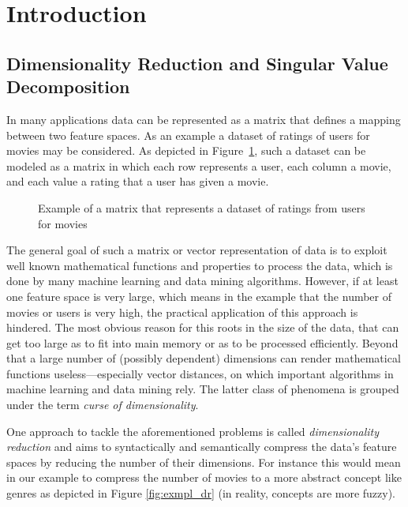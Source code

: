 \section{Introduction}

\subsection{Dimensionality Reduction and Singular Value Decomposition}

In many applications data can be represented as a matrix that defines a mapping
between two feature spaces. As an example a dataset of ratings of users for
movies may be considered. As depicted in Figure~\ref{fig:exmpl_matrix}, such a
dataset can be modeled as a matrix in which each row represents a user, each
column a movie, and each value a rating that a user has given a movie.

\begin{figure}[h]
\centering
{}
\caption{Example of a matrix that represents a dataset of ratings from users
for movies}
\label{fig:exmpl_matrix}
\end{figure}

The general goal of such a matrix or vector representation of data is to exploit well known mathematical functions and properties to process the data, which is done by many machine learning and data mining algorithms. However, if at least one feature space is very large, which means in the example that the number of movies or users is very high, the practical application of this approach is hindered. The most obvious reason for this roots in the size of the data, that can get too large as to fit into main memory or as to be processed efficiently. Beyond that a large number of (possibly dependent) dimensions can render mathematical functions useless---especially vector distances, on which important algorithms in machine learning and data mining rely. The latter class of phenomena is grouped under the term \textsl{curse of dimensionality}.

One approach to tackle the aforementioned problems is called \textsl{dimensionality reduction} and aims to syntactically and semantically compress the data's feature spaces by reducing the number of their dimensions. For instance this would mean in our example to compress the number of movies to a more abstract concept like genres as depicted in Figure \ref{fig:exmpl_dr} (in reality, concepts are more fuzzy).

